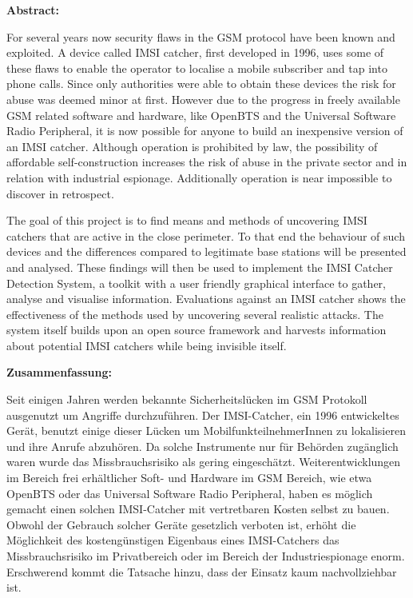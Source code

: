 \begin{center}
\textbf{Abstract:}\\
\vspace{.1cm}
\end{center}
For several years now security flaws in the GSM protocol have been known and exploited.
A device called IMSI catcher, first developed in 1996, uses some of these flaws to enable the operator to localise a mobile subscriber and tap into phone calls.
Since only authorities were able to obtain these devices the risk for abuse was deemed minor at first.
However due to the progress in freely available GSM related software and hardware, like OpenBTS and the Universal Software Radio Peripheral, it is now possible for anyone to build an inexpensive version of an IMSI catcher.
Although operation is prohibited by law, the possibility of affordable self-construction increases the risk of abuse in the private sector and in relation with industrial espionage.
Additionally operation is near impossible to discover in retrospect.

The goal of this project is to find means and methods of uncovering IMSI catchers that are active in the close perimeter.
To that end the behaviour of such devices and the differences compared to legitimate base stations will be presented and analysed.
These findings will then be used to implement the IMSI Catcher Detection System, a toolkit with a user friendly graphical interface to gather, analyse and visualise information.
Evaluations against an IMSI catcher shows the effectiveness of the methods used by uncovering several realistic attacks.
The system itself builds upon an open source framework and harvests information about potential IMSI catchers while being invisible itself.
\vspace{.5cm}

\begin{center}
\textbf{Zusammenfassung:}\\
\vspace{.1cm}
\end{center}
Seit einigen Jahren werden bekannte Sicherheitsl\"ucken im GSM Protokoll ausgenutzt um Angriffe durchzuf\"uhren.
Der IMSI-Catcher, ein 1996 entwickeltes Ger\"at, benutzt einige dieser L\"ucken um MobilfunkteilnehmerInnen zu lokalisieren und ihre Anrufe abzuh\"oren.
Da solche Instrumente nur f\"ur Beh\"orden zug\"anglich waren wurde das Missbrauchsrisiko als gering eingesch\"atzt.
Weiterentwicklungen im Bereich frei erh\"altlicher Soft- und Hardware im GSM Bereich, wie etwa OpenBTS oder das Universal Software Radio Peripheral, haben es m\"oglich gemacht einen solchen IMSI-Catcher mit vertretbaren Kosten selbst zu bauen.
Obwohl der Gebrauch solcher Ger\"ate gesetzlich verboten ist, erhöht die Möglichkeit des kostengünstigen Eigenbaus eines IMSI-Catchers das Missbrauchsrisiko im Privatbereich oder im Bereich der Industriespionage enorm.
Erschwerend kommt die Tatsache hinzu, dass der Einsatz kaum nachvollziehbar ist.

